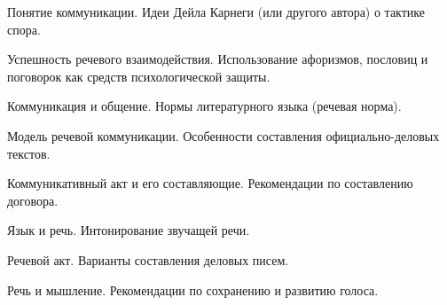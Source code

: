 \documentclass[
	14pt,
	a4paper,
	]
	{scrartcl}
\begin{document}
\shapk
{}
\setcounter{zad}{0}

\vfill
\z Понятие коммуникации.
 \vfill
\z Идеи Дейла Карнеги (или другого автора) о тактике спора. \vfill

\vfill

\newpage


\shapk
{}
\setcounter{zad}{0}

\vfill
\z Успешность речевого взаимодействия.
 \vfill
\z Использование афоризмов, пословиц и поговорок как средств психологической защиты.
 \vfill

\vfill

\newpage


\shapk
{}
\setcounter{zad}{0}

\vfill
\z Коммуникация и общение.
 \vfill
\z Нормы литературного языка (речевая норма).
 \vfill

\vfill

\newpage


\shapk
{}
\setcounter{zad}{0}

\vfill
\z Модель речевой коммуникации.
 \vfill
\z Особенности составления официально-деловых текстов.
 \vfill

\vfill

\newpage


\shapk
{}
\setcounter{zad}{0}

\vfill
\z Коммуникативный акт и его составляющие.
 \vfill
\z Рекомендации по составлению договора.
 \vfill

\vfill

\newpage


\shapk
{}
\setcounter{zad}{0}

\vfill
\z Язык и речь.
 \vfill
\z Интонирование звучащей речи.
 \vfill

\vfill

\newpage


\shapk
{}
\setcounter{zad}{0}

\vfill
\z Речевой акт.
 \vfill
\z Варианты составления деловых писем.
 \vfill

\vfill

\newpage


\shapk
{}
\setcounter{zad}{0}

\vfill
\z Речь и мышление.
 \vfill
\z Рекомендации по сохранению и развитию голоса.
 \vfill
\end{document}
